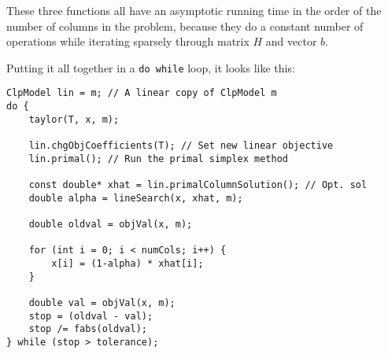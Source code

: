 These three functions all have an asymptotic running time in the order of the
number of columns in the problem, because they do a constant number of
operations while iterating sparsely through matrix $H$ and vector $b$.

Putting it all together in a \texttt{do while} loop, it looks like this:
\begin{verbatim}
ClpModel lin = m; // A linear copy of ClpModel m
do {
    taylor(T, x, m);

    lin.chgObjCoefficients(T); // Set new linear objective
    lin.primal(); // Run the primal simplex method
    
    const double* xhat = lin.primalColumnSolution(); // Opt. sol
    double alpha = lineSearch(x, xhat, m);

    double oldval = objVal(x, m);

    for (int i = 0; i < numCols; i++) {
        x[i] = (1-alpha) * xhat[i];
    }

    double val = objVal(x, m);
    stop = (oldval - val);
    stop /= fabs(oldval);
} while (stop > tolerance);
\end{verbatim}
